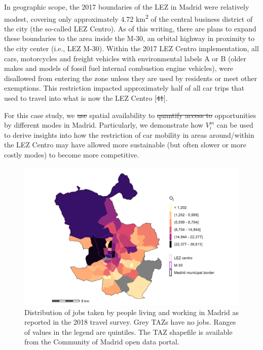\documentclass[10pt,letterpaper]{article}
\providecommand{\DIFaddtex}[1]{{\protect\color{blue}\uwave{#1}}} %
\providecommand{\DIFdeltex}[1]{{\protect\color{red}\sout{#1}}}                      %
\providecommand{\DIFaddbegin}{} %
\providecommand{\DIFaddend}{} %
\providecommand{\DIFdelbegin}{} %
\providecommand{\DIFdelend}{} %
\providecommand{\DIFadd}[1]{\texorpdfstring{\DIFaddtex{#1}}{#1}} %
\providecommand{\DIFdel}[1]{\texorpdfstring{\DIFdeltex{#1}}{}} %
\newcommand{\DIFscaledelfig}{0.5}
\newlength{\DIFdelgraphicswidth} %
\newlength{\DIFdelgraphicsheight} %
\newcommand{\DIFaddincludegraphics}[2][]{{\color{blue}\fbox{\DIFOincludegraphics[#1]{#2}}}} %
\newcommand{\DIFdelincludegraphics}[2][]{%
\sbox{\DIFdelgraphicsbox}{\DIFOincludegraphics[#1]{#2}}%
\settoboxwidth{\DIFdelgraphicswidth}{\DIFdelgraphicsbox} %
\settoboxtotalheight{\DIFdelgraphicsheight}{\DIFdelgraphicsbox} %
\scalebox{\DIFscaledelfig}{%
\parbox[b]{\DIFdelgraphicswidth}{\usebox{\DIFdelgraphicsbox}\\[-\baselineskip] \rule{\DIFdelgraphicswidth}{0em}}\llap{\resizebox{\DIFdelgraphicswidth}{\DIFdelgraphicsheight}{%
\setlength{\unitlength}{\DIFdelgraphicswidth}%
\begin{picture}(1,1)%
\thicklines\linethickness{2pt} %
{\color[rgb]{1,0,0}\put(0,0){\framebox(1,1){}}}%
{\color[rgb]{1,0,0}\put(0,0){\line( 1,1){1}}}%
{\color[rgb]{1,0,0}\put(0,1){\line(1,-1){1}}}%
\end{picture}%
}\hspace*{3pt}}} %
} %
\DeclareRobustCommand{\DIFaddbegin}{\DIFOaddbegin \let\includegraphics\DIFaddincludegraphics} %
\DeclareRobustCommand{\DIFaddend}{\DIFOaddend \let\includegraphics\DIFOincludegraphics} %
\DeclareRobustCommand{\DIFdelbegin}{\DIFOdelbegin \let\includegraphics\DIFdelincludegraphics} %
\DeclareRobustCommand{\DIFdelend}{\DIFOaddend \let\includegraphics\DIFOincludegraphics} %
\begin{document}
In geographic scope, the 2017 boundaries of the LEZ in Madrid were
relatively modest, covering only approximately 4.72
km\textsuperscript{2} of the central business district of the city (the
so-called LEZ Centro). As of this writing, there are plans to expand
these boundaries to the area inside the M-30, an orbital highway in
proximity to the city center (i.e., LEZ M-30). Within the 2017 LEZ
Centro implementation, all cars, motorcycles and freight vehicles with
environmental labels A or B (older makes and models of fossil fuel
internal combustion engine vehicles), were disallowed from entering the
zone unless they are used by residents or meet other exemptions. This
restriction impacted approximately half of all car trips that used to
travel into what is now the LEZ Centro {[}\DIFdelbegin \DIFdel{41}\DIFdelend \DIFaddbegin \DIFadd{52}\DIFaddend {]}.

For this case study, we \DIFdelbegin \DIFdel{use }\DIFdelend \DIFaddbegin \DIFadd{quantify }\DIFaddend spatial availability to \DIFdelbegin \DIFdel{quantify access to
}\DIFdelend opportunities
by different modes in Madrid. Particularly, we demonstrate how \(V_i^m\)
can be used to derive insights into how the restriction of car mobility
in areas around/within the LEZ Centro may have allowed more sustainable
(but often slower or more costly modes) to become more competitive.

\begin{figure}

{\centering \includegraphics[width=0.85\linewidth]{images/Fig2} 

}

\caption{\label{fig:Fig2} Distribution of jobs taken by people living and working in Madrid as reported in the 2018 travel survey. Grey TAZs have no jobs. Ranges of values in the legend are quintiles. The TAZ shapefile is available from the Community of Madrid open data portal.}\label{fig:jobs-plot}
\end{figure}
\end{document}
